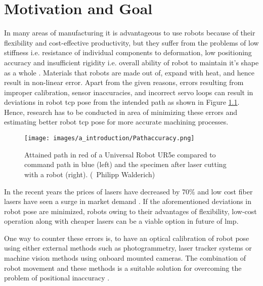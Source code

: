 \chapter{Motivation and Goal}\label{chap:motivation_and_goal}

In many areas of manufacturing it is advantageous to use robots because of their flexibility and cost-effective productivity, but they suffer from the problems of low stiffness i.e. resistance of individual components to deformation, low positioning accuracy and insufficient rigidity i.e. overall ability of robot to maintain it's shape as a whole \cite{ji, chen}. Materials that robots are made out of, expand with heat, and hence result in non-linear error. Apart from the given reasons, errors resulting from improper calibration, sensor inaccuracies, and incorrect servo loops \cite{greenway, torgny} can result in deviations in robot \Gls{tcp} pose from the intended path as shown in Figure \ref{fig:fig_walderich}. Hence, research has to be conducted in area of minimizing these errors and estimating better robot \Gls{tcp} pose for more accurate machining processes.

\vspace{5mm}

    \vspace{5mm}
    \begin{figure}[h]
        \centering
        \texttt{[image: images/a\_introduction/Pathaccuracy.png]}
        \caption{Attained path in red of a Universal Robot UR5e compared to command path in blue (left) and the specimen after laser cutting with a robot (right). (\textcopyright \ Philipp Walderich) \cite{img_walderich}}
        \label{fig:fig_walderich}
    \end{figure}
    \vspace{5mm}

    \noindent In the recent years the prices of lasers have decreased by 70\% and low cost fiber lasers have seen a surge in market demand \cite{optech}. If the aforementioned deviations in robot pose are minimized, robots owing to their advantages of flexibility, low-cost operation along with cheaper lasers can be a viable option in future of \gls{lmp}.
    
    \vspace{5mm}

    \noindent One way to counter these errors is, to have an optical calibration of robot pose using either external methods such as photogrammetry, laser tracker systems or machine vision methods using onboard mounted cameras. The combination of robot movement and these methods is a suitable solution for overcoming the problem of positional inaccuracy \cite{perez}.
    
